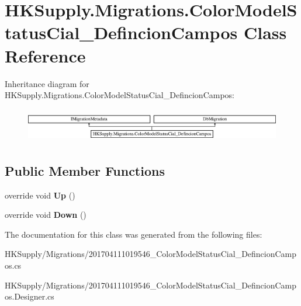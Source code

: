 \hypertarget{class_h_k_supply_1_1_migrations_1_1_color_model_status_cial___defincion_campos}{}\section{H\+K\+Supply.\+Migrations.\+Color\+Model\+Status\+Cial\+\_\+\+Defincion\+Campos Class Reference}
\label{class_h_k_supply_1_1_migrations_1_1_color_model_status_cial___defincion_campos}
Inheritance diagram for H\+K\+Supply.\+Migrations.\+Color\+Model\+Status\+Cial\+\_\+\+Defincion\+Campos\+:\begin{figure}[H]
\begin{center}
\leavevmode
\includegraphics[height=1.509434cm]{class_h_k_supply_1_1_migrations_1_1_color_model_status_cial___defincion_campos}
\end{center}
\end{figure}
\subsection*{Public Member Functions}
\begin{DoxyCompactItemize}
\item 
\mbox{\label{class_h_k_supply_1_1_migrations_1_1_color_model_status_cial___defincion_campos_af277e350ec4d13fbbb4683dff4ee091c}} 
override void {\bfseries Up} ()
\item 
\mbox{\label{class_h_k_supply_1_1_migrations_1_1_color_model_status_cial___defincion_campos_a8ca77377679a62418e96a37c0debac98}} 
override void {\bfseries Down} ()
\end{DoxyCompactItemize}


The documentation for this class was generated from the following files\+:\begin{DoxyCompactItemize}
\item 
H\+K\+Supply/\+Migrations/201704111019546\+\_\+\+Color\+Model\+Status\+Cial\+\_\+\+Defincion\+Campos.\+cs\item 
H\+K\+Supply/\+Migrations/201704111019546\+\_\+\+Color\+Model\+Status\+Cial\+\_\+\+Defincion\+Campos.\+Designer.\+cs\end{DoxyCompactItemize}
